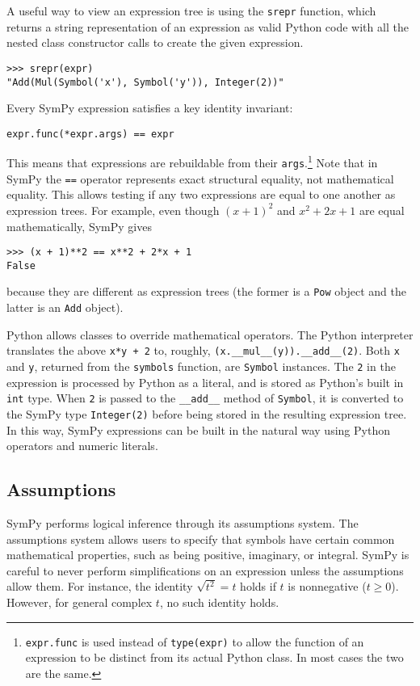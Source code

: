 A useful way to view an expression tree is using the \texttt{srepr} function, which
returns a string representation of an expression as valid Python code
with all the nested class constructor calls to create the given expression.
\begin{verbatim}
>>> srepr(expr)
"Add(Mul(Symbol('x'), Symbol('y')), Integer(2))"
\end{verbatim}

Every SymPy expression satisfies a key identity invariant:
\begin{verbatim}
expr.func(*expr.args) == expr
\end{verbatim}
This means that expressions are
rebuildable from their \texttt{args}.\footnote{\texttt{expr.func} is used
instead of \texttt{type(expr)} to allow the function of an expression to be
distinct from its actual Python class. In most cases the two are the same.}
Note that in SymPy the \texttt{==} operator represents exact
structural equality, not mathematical equality. This allows testing if any two
expressions are equal to one another as expression trees. For example, even
though ${(x + 1)}^2$ and $x^2 + 2x + 1$ are equal mathematically, SymPy gives
\begin{verbatim}
>>> (x + 1)**2 == x**2 + 2*x + 1
False
\end{verbatim}
because they are different as expression trees (the former is a \verb|Pow|
object and the latter is an \verb|Add| object).

Python allows classes to override mathematical operators. The Python
interpreter translates the above \texttt{x*y + 2} to, roughly,
\verb|(x.__mul__(y)).__add__(2)|. Both \texttt{x} and \texttt{y}, returned
from the \texttt{symbols} function, are \texttt{Symbol} instances. The
\texttt{2} in the expression is processed by Python as a literal, and is
stored as Python's built in \texttt{int} type. When \texttt{2} is passed to the
\verb|__add__| method of \texttt{Symbol}, it is converted to the SymPy type
\verb|Integer(2)| before being stored in the resulting expression tree. In
this way, SymPy expressions can be built in the natural way using Python
operators and numeric literals.

\subsection{Assumptions}
\label{sec:assumptions}

SymPy performs logical inference through its assumptions system. The
assumptions system allows users to specify that symbols have certain common
mathematical properties, such as being positive, imaginary, or integral. SymPy
is careful to never perform simplifications on an expression unless the
assumptions allow them. For instance, the identity $\sqrt{t^2} = t$ holds if
$t$ is nonnegative ($t\ge 0$). However, for general complex $t$, no
such identity holds.

